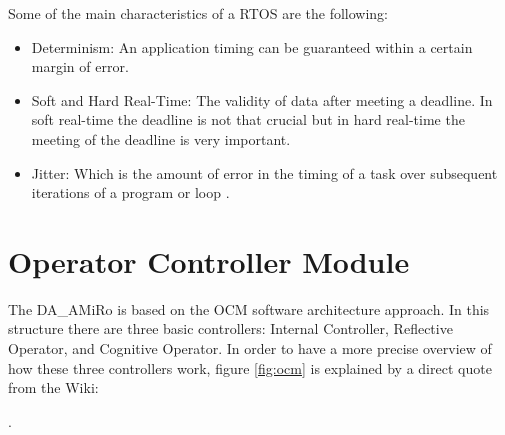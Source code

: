 \documentclass[12pt]{report}%
\begin{document}
Some of the main characteristics of a RTOS are the following:

\begin{itemize}
\item Determinism: An application timing can be guaranteed within a certain margin of error.
\item Soft and Hard Real-Time: The validity of data after meeting a deadline. In soft real-time the deadline is not that crucial but in hard real-time the meeting of the deadline is very important.
\item Jitter: Which is the amount of error in the timing of a task over subsequent iterations of a program or loop \cite{whatisRTOS}.
\end{itemize}

\section{Operator Controller Module}

The DA\_AMiRo is based on the OCM \cite{ocmAuto} software architecture approach. In this structure there are three basic controllers: Internal Controller, Reflective Operator, and Cognitive Operator. In order to have a more precise overview of how these three controllers work, figure \ref{fig:ocm} is explained by a direct quote from the Wiki:

\cite{DAEbot_Wiki}.
\end{document}
